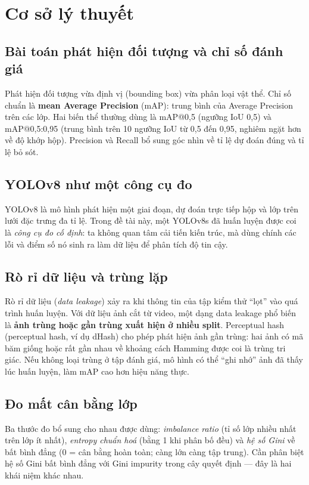 \chapter{Cơ sở lý thuyết}
\label{ch:cosoly}

\section{Bài toán phát hiện đối tượng và chỉ số đánh giá}

Phát hiện đối tượng vừa định vị (bounding box) vừa phân loại vật thể. Chỉ số chuẩn là
\textbf{mean Average Precision} (mAP): trung bình của Average Precision trên các lớp. Hai biến
thể thường dùng là mAP@0,5 (ngưỡng IoU 0,5) và mAP@0,5:0,95 (trung bình trên 10 ngưỡng IoU từ
0,5 đến 0,95, nghiêm ngặt hơn về độ khớp hộp). Precision và Recall bổ sung góc nhìn về tỉ lệ dự
đoán đúng và tỉ lệ bỏ sót.

\section{YOLOv8 như một công cụ đo}

YOLOv8 \cite{yolov8} là mô hình phát hiện một giai đoạn, dự đoán trực tiếp hộp và lớp trên lưới
đặc trưng đa tỉ lệ. Trong đề tài này, một YOLOv8s đã huấn luyện được coi là \emph{công cụ đo cố
định}: ta không quan tâm cải tiến kiến trúc, mà dùng chính các lỗi và điểm số nó sinh ra làm dữ
liệu để phân tích độ tin cậy.

\section{Rò rỉ dữ liệu và trùng lặp}

Rò rỉ dữ liệu (\textit{data leakage}) xảy ra khi thông tin của tập kiểm thử ``lọt'' vào quá
trình huấn luyện. Với dữ liệu ảnh cắt từ video, một dạng data leakage phổ biến là \textbf{ảnh trùng
hoặc gần trùng xuất hiện ở nhiều split}. Perceptual hash (perceptual hash, ví dụ dHash) cho phép
phát hiện ảnh gần trùng: hai ảnh có mã băm giống hoặc rất gần nhau về khoảng cách Hamming được
coi là trùng tri giác. Nếu không loại trùng ở tập đánh giá, mô hình có thể ``ghi nhớ'' ảnh đã
thấy lúc huấn luyện, làm mAP cao hơn hiệu năng thực.

\section{Đo mất cân bằng lớp}

Ba thước đo bổ sung cho nhau được dùng: \emph{imbalance ratio} (tỉ số lớp nhiều nhất trên lớp ít
nhất), \emph{entropy chuẩn hoá} (bằng 1 khi phân bố đều) và \emph{hệ số Gini} về bất bình đẳng
(0 = cân bằng hoàn toàn; càng lớn càng tập trung). Cần phân biệt hệ số Gini bất bình đẳng với
Gini impurity trong cây quyết định --- đây là hai khái niệm khác nhau.

